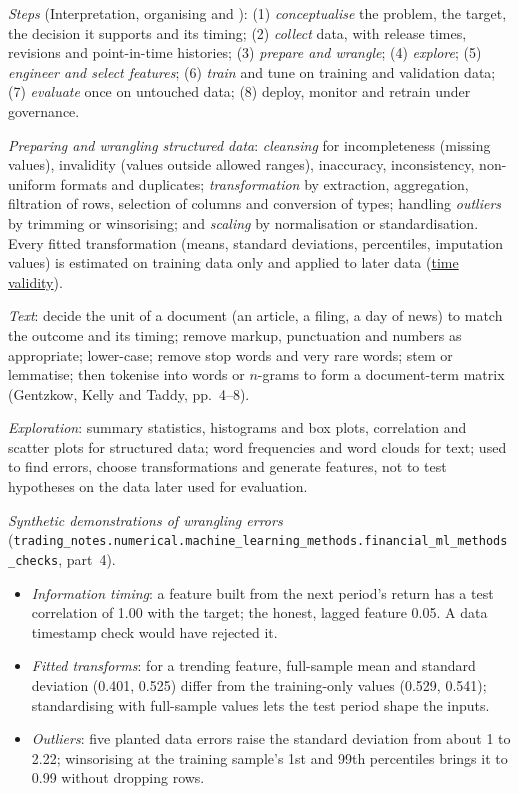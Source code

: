 \begin{qfmethod}\label{meth:data-analysis-project}
 \emph{Steps} (Interpretation, organising \citep[pp.~2--8]{wide-gentzkow-kelly-taddy} and \citep[pp.~23--28]{alpha-afml}): (1) \emph{conceptualise} the problem, the target, the decision it supports and its timing; (2) \emph{collect} data, with release times, revisions and point-in-time histories; (3) \emph{prepare and wrangle}; (4) \emph{explore}; (5) \emph{engineer and select features}; (6) \emph{train} and tune on training and validation data; (7) \emph{evaluate} once on untouched data; (8) deploy, monitor and retrain under governance.

\emph{Preparing and wrangling structured data}: \emph{cleansing} for incompleteness (missing values), invalidity (values outside allowed ranges), inaccuracy, inconsistency, non-uniform formats and duplicates; \emph{transformation} by extraction, aggregation, filtration of rows, selection of columns and conversion of types; handling \emph{outliers} by trimming or winsorising; and \emph{scaling} by normalisation or standardisation. Every fitted transformation (means, standard deviations, percentiles, imputation values) is estimated on training data only and applied to later data (\hyperref[pit:label-weight-leakage]{time validity}).

\emph{Text}: decide the unit of a document (an article, a filing, a day of news) to match the outcome and its timing; remove markup, punctuation and numbers as appropriate; lower-case; remove stop words and very rare words; stem or lemmatise; then tokenise into words or $n$-grams to form a document-term matrix (Gentzkow, Kelly and Taddy, pp.~4--8).

\emph{Exploration}: summary statistics, histograms and box plots, correlation and scatter plots for structured data; word frequencies and word clouds for text; used to find errors, choose transformations and generate features, not to test hypotheses on the data later used for evaluation.

 \emph{Synthetic demonstrations of wrangling errors} (\nolinkurl{trading_notes.numerical.machine_learning_methods.financial_ml_methods_checks}, part~4).
\begin{itemize}
\item \emph{Information timing}: a feature built from the next period's return has a test correlation of 1.00 with the target; the honest, lagged feature 0.05. A data timestamp check would have rejected it.
\item \emph{Fitted transforms}: for a trending feature, full-sample mean and standard deviation (0.401, 0.525) differ from the training-only values (0.529, 0.541); standardising with full-sample values lets the test period shape the inputs.
\item \emph{Outliers}: five planted data errors raise the standard deviation from about 1 to 2.22; winsorising at the training sample's 1st and 99th percentiles brings it to 0.99 without dropping rows.
\end{itemize}


\end{qfmethod}
